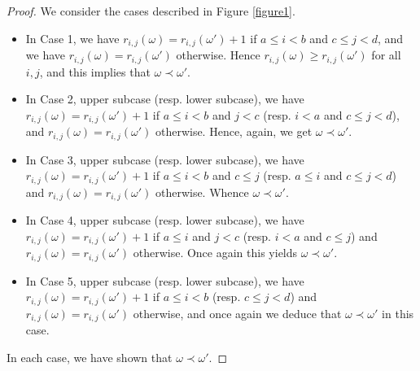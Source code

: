 \documentclass[ALCO,Unicode]{cedram}
\begin{document}
\begin{proof}
We consider the cases described in Figure \ref{figure1}.
\begin{itemize}
\item
In Case 1, we have $r_{i,j}(\omega)=r_{i,j}(\omega')+1$ if $a\leq i<b$ and $c\leq j<d$, and we have $r_{i,j}(\omega)=r_{i,j}(\omega')$ otherwise.
Hence $r_{i,j}(\omega)\geq r_{i,j}(\omega')$ for all $i,j$, and this implies that $\omega\prec\omega'$.
\item In Case 2, upper subcase (resp. lower subcase), we have $r_{i,j}(\omega)=r_{i,j}(\omega')+1$ if $a\leq i<b$ and $j<c$ (resp. $i<a$ and $c\leq j<d$), and $r_{i,j}(\omega)=r_{i,j}(\omega')$ otherwise. Hence, again, we get $\omega\prec\omega'$.
\item In Case 3, upper subcase (resp. lower subcase), we have $r_{i,j}(\omega)=r_{i,j}(\omega')+1$ if $a\leq i<b$ and $c\leq j$ (resp. $a\leq i$ and $c\leq j<d$) and $r_{i,j}(\omega)=r_{i,j}(\omega')$ otherwise. Whence $\omega\prec\omega'$.
\item In Case 4, upper subcase (resp. lower subcase), we have $r_{i,j}(\omega)=r_{i,j}(\omega')+1$ if $a\leq i$ and $j<c$ (resp. $i<a$ and $c\leq j$) and $r_{i,j}(\omega)=r_{i,j}(\omega')$ otherwise. Once again this yields $\omega\prec\omega'$.
\item In Case 5, upper subcase (resp. lower subcase), we have $r_{i,j}(\omega)=r_{i,j}(\omega')+1$ if $a\leq i<b$ (resp. $c\leq j<d$) and $r_{i,j}(\omega)=r_{i,j}(\omega')$ otherwise, and once again we deduce that $\omega\prec\omega'$ in this case.
\end{itemize}
In each case, we have shown that $\omega\prec\omega'$.


\end{proof}
\end{document}
